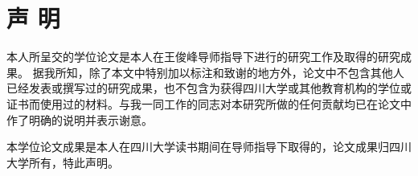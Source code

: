 
\chapter{声 明}
本人所呈交的学位论文是本人在王俊峰导师指导下进行的研究工作及取得的研究成果。
据我所知，除了本文中特别加以标注和致谢的地方外，论文中不包含其他人已经发表或撰写过的研究成果，也不包含为获得{四川大学}或其他教育机构的学位或证书而使用过的材料。与我一同工作的同志对本研究所做的任何贡献均已在论文中作了明确的说明并表示谢意。

本学位论文成果是本人在{四川大学}读书期间在导师指导下取得的，论文成果归四川大学所有，特此声明。
\vspace{4cm}
\autograph
